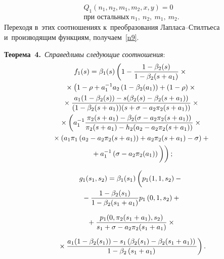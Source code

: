 \begin{multicols}{2}
\vspace*{-12pt}

\noindent
\begin{multline*}
Q_1\left(n_1,n_2,m_1,m_2,x,y\right)=0 \\
 \mbox{при остальных}\ n_1,\ n_2,\ m_1,\ m_2.
\end{multline*}
Переходя в~этих соотношениях к~преобразования Лап\-ла\-са--Стилть\-еса 
и~производящим функциям, получаем~\eqref{n9}.



\noindent
\textbf{Теорема~4.}\
\textit{Справедливы следующие соотношения}:
\begin{multline*}
f_1(s)=\beta_1(s)\left(1-\fr{1-\beta_2(s)}{1-\beta_2(s+a_1)}\times{}\right.\\
\left.{}\times
\left(1-\rho+a_1^{-1}a_2\left(1-\beta_2(a_1)\right)+
(1-\rho)\times{}\right.\right.
\\
{}\times
\fr{a_1(1-\beta_2(s))-s(\beta_2(s)-\beta_2(s+a_1))}
{(1-\beta_2(s+a_1))(s+\sigma-a_2\pi_2(s+a_1))}\times{}\\
{}\times 
\left(a_1^{-1}
\fr{\pi_2(s+a_1)-\beta_2(\sigma-a_2\pi_2(s+a_1))}
{\pi_2(s+a_1)-h_2(a_2-a_2\pi_2(s+a_1))}\times{} \right.
\\
{}\times
\left(a_1\pi_1\left(a_2-a_2\pi_2(s+a_1)\right)+a_2\pi_2(s+a_1)-\sigma\right)+{}\\
\left.\left.{}+a_1^{-1}\left(\sigma-a_2\pi_2(a_1)\right)
\vphantom{\fr{1-\beta_2(s)}{1-\beta_2(s+a_1)}}
\right)\right);
\end{multline*}

\vspace*{-22pt}

\noindent
\begin{multline*}
g_1(s_1,s_2)=\beta_1(s_1)\left(
\vphantom{\fr{1-\beta_2(s_1)}{1-\beta_2(s_1+a_1)}}
p_1(1,1,s_2)-{}\right.\\
{}-
\fr{1-\beta_2(s_1)}{1-\beta_2(s_1+a_1)}
p_1\left(0,1,s_2\right)+{}
\end{multline*}

\noindent
\begin{multline*}
{}+
\displaystyle\frac{\displaystyle p_1(0,\pi_2(s_1+a_1),s_2)\mathstrut}{\displaystyle s_1+\sigma-a_2\pi_2(s_1+a_1)\mathstrut}\times{}\\[6pt]
\left.{}\times
\displaystyle\frac{\displaystyle a_1(1-\beta_2(s_1))-s_1\left(\beta_2(s_1)-\beta_2(s_1+a_1)\right)\mathstrut}{\displaystyle 1-\beta_2\left(s_1+a_1\right)\mathstrut}\right).
\end{multline*}

\vspace*{-16pt}


\end{multicols}
